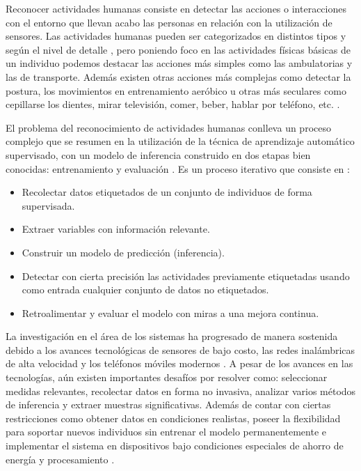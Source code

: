 Reconocer actividades humanas consiste en detectar las acciones o
interacciones con el entorno que llevan acabo las personas en relación
con la utilización de sensores. Las actividades humanas pueden ser
categorizados en distintos tipos y según el nivel de detalle \cite{Chen2012},
pero poniendo foco en las actividades físicas básicas de un individuo
podemos destacar las acciones más simples como las ambulatorias y
las de transporte. Además existen otras acciones más complejas como
detectar la postura, los movimientos en entrenamiento aeróbico u otras
más seculares como cepillarse los dientes, mirar televisión, comer,
beber, hablar por teléfono, etc. \cite{LaraLabrador2013}.

El problema del reconocimiento de actividades humanas conlleva un
proceso complejo que se resumen en la utilización de la técnica de
aprendizaje automático supervisado, con un modelo de inferencia construido
en dos etapas bien conocidas: entrenamiento y evaluación \cite{LaraLabrador2013,Kwapisz2011}.
Es un proceso iterativo que consiste en \cite{Bao2004}:
\begin{itemize}
\item Recolectar datos etiquetados de un conjunto de individuos de forma
supervisada. 
\item Extraer variables con información relevante.
\item Construir un modelo de predicción (inferencia).
\item Detectar con cierta precisión las actividades previamente etiquetadas
usando como entrada cualquier conjunto de datos no etiquetados.
\item Retroalimentar y evaluar el modelo con miras a una mejora continua.
\end{itemize}
La investigación en el área de los sistemas  ha progresado
de manera sostenida debido a los avances tecnológicas de sensores
de bajo costo, las redes inalámbricas de alta velocidad y los teléfonos
móviles modernos \cite{Chen2012}. A pesar de los avances en las tecnologías,
aún existen importantes desafíos por resolver como: seleccionar medidas
relevantes, recolectar datos en forma no invasiva, analizar varios
métodos de inferencia y extraer muestras significativas. Además de
contar con ciertas restricciones como obtener datos en condiciones
realistas, poseer la flexibilidad para soportar nuevos individuos
sin entrenar el modelo permanentemente e implementar el sistema en
dispositivos bajo condiciones especiales de ahorro de energía y procesamiento
\cite{LaraLabrador2013}. 

